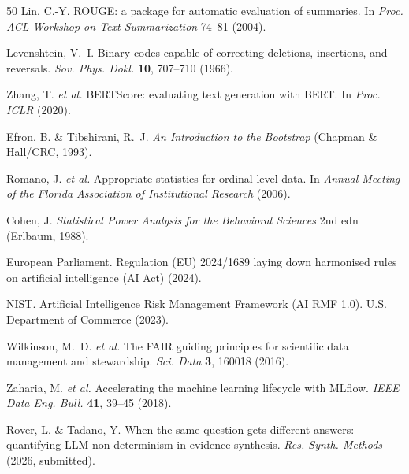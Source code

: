 \documentclass[sn-nature]{sn-jnl}
\begin{document}
\begin{thebibliography}{50}
Lin, C.-Y.
ROUGE: a package for automatic evaluation of summaries.
In \emph{Proc. ACL Workshop on Text Summarization} 74--81 (2004).

Levenshtein, V.~I.
Binary codes capable of correcting deletions, insertions, and reversals.
\emph{Sov. Phys. Dokl.} \textbf{10}, 707--710 (1966).

Zhang, T. \emph{et al.}
BERTScore: evaluating text generation with BERT.
In \emph{Proc. ICLR} (2020).

Efron, B. \& Tibshirani, R.~J.
\emph{An Introduction to the Bootstrap} (Chapman \& Hall/CRC, 1993).

Romano, J. \emph{et al.}
Appropriate statistics for ordinal level data.
In \emph{Annual Meeting of the Florida Association of Institutional Research} (2006).

Cohen, J.
\emph{Statistical Power Analysis for the Behavioral Sciences} 2nd edn (Erlbaum, 1988).

European Parliament.
Regulation (EU) 2024/1689 laying down harmonised rules on artificial intelligence (AI Act) (2024).

NIST.
Artificial Intelligence Risk Management Framework (AI RMF 1.0).
U.S. Department of Commerce (2023).

Wilkinson, M.~D. \emph{et al.}
The FAIR guiding principles for scientific data management and stewardship.
\emph{Sci. Data} \textbf{3}, 160018 (2016).

Zaharia, M. \emph{et al.}
Accelerating the machine learning lifecycle with MLflow.
\emph{IEEE Data Eng. Bull.} \textbf{41}, 39--45 (2018).

Rover, L. \& Tadano, Y.
When the same question gets different answers: quantifying LLM non-determinism in evidence synthesis.
\emph{Res. Synth. Methods} (2026, submitted).

\end{thebibliography}
\end{document}
